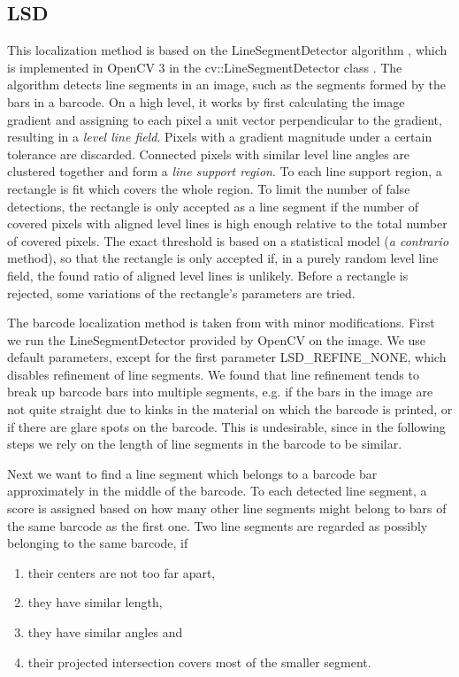 \subsection{LSD}\label{sec:LSD}
This localization method is based on the LineSegmentDetector algorithm
\cite{GromponevonGioi2012}, which is implemented in OpenCV 3 in the
cv::LineSegmentDetector class \cite{Bradski2017}. The algorithm detects line
segments in an image, such as the segments formed by the bars in a barcode.
On a high level, it works by first calculating the image gradient and assigning
to each pixel a unit vector perpendicular to the gradient, resulting in a
\emph{level line field}. Pixels with a gradient magnitude under a certain
tolerance are discarded. Connected pixels with similar level line angles are clustered
together and form a \emph{line support region}. To each line support region, a
rectangle is fit which covers the whole region. To limit the number of false
detections, the rectangle is only accepted as a line segment if the number of
covered pixels with aligned level lines is high enough relative to the total number of
covered pixels. The exact threshold is based on a statistical model (\emph{a
  contrario} method), so that the rectangle is only accepted if,
in a purely random level line field, the found ratio of aligned level lines is unlikely.
Before a rectangle is rejected, some variations of the rectangle's parameters
are tried.

The barcode localization method is taken from \citeauthor{Creusot2016} \cite{Creusot2016} with minor modifications. First we run
the LineSegmentDetector provided by OpenCV on the image. We use default
parameters, except for the first parameter LSD\_REFINE\_NONE, which disables
refinement of line segments. We found that line refinement tends to break up
barcode bars into multiple segments, e.g. if the bars in the image are not quite
straight due to kinks in the material on which the barcode is printed, or if
there are glare spots on the barcode. This is undesirable, since in the
following steps we rely on the length of line segments in the barcode to be similar.

Next we want to find a line segment which belongs to a barcode bar approximately
in the middle of the barcode. To each detected line segment, a score is assigned
based on how many other line segments might belong to bars of the same barcode as the first
one. Two line segments are regarded as possibly belonging to the same barcode, if
\begin{enumerate}
\item their centers are not too far apart,
\item they have similar length,
\item they have similar angles and
\item their projected intersection covers most of the smaller segment.
\end{enumerate}

